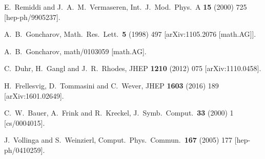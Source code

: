 \documentclass[12pt]{article}
\begin{document}
\begin{thebibliography}{99}
  E.~Remiddi and J.~A.~M.~Vermaseren,
  Int.\ J.\ Mod.\ Phys.\ A {\bf 15} (2000) 725
   [hep-ph/9905237].
  
  A.~B.~Goncharov,
  Math.\ Res.\ Lett.\  {\bf 5} (1998) 497
   [arXiv:1105.2076 [math.AG]].
  
  A.~B.~Goncharov,
  math/0103059 [math.AG].
  
  C.~Duhr, H.~Gangl and J.~R.~Rhodes,
  JHEP {\bf 1210} (2012) 075
   [arXiv:1110.0458].
  
  H.~Frellesvig, D.~Tommasini and C.~Wever,
  JHEP {\bf 1603} (2016) 189
  [arXiv:1601.02649].
  
  C.~W.~Bauer, A.~Frink and R.~Kreckel,
  J.\ Symb.\ Comput.\  {\bf 33} (2000) 1
  [cs/0004015].

  J.~Vollinga and S.~Weinzierl,
  Comput.\ Phys.\ Commun.\  {\bf 167} (2005) 177
  [hep-ph/0410259].


\end{thebibliography}
\end{document}
